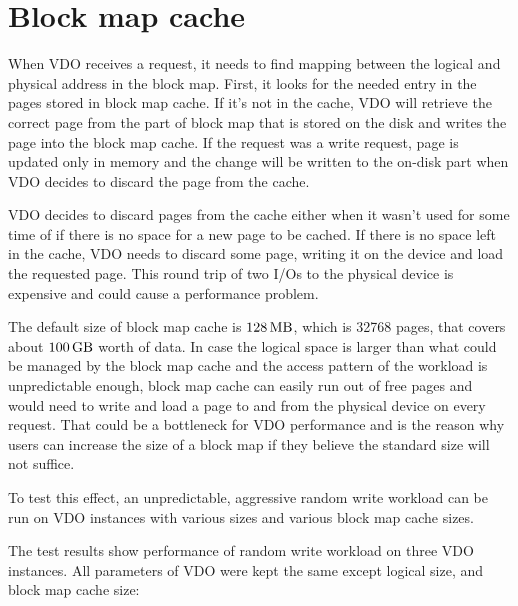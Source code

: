 \documentclass[
  color, %
  table, %
  lof,   %
  lot,   %
]{fithesis3}
\begin{document}
\section{Block map cache}

When VDO receives a request, it needs to find mapping between the logical and physical address in the block map. First, it looks for the needed entry in the pages stored in block map cache. If it's not in the cache, VDO will retrieve the correct page from the part of block map that is stored on the disk and writes the page into the block map cache. If the request was a write request, page is updated only in memory and the change will be written to the on-disk part when VDO decides to discard the page from the cache.

VDO decides to discard pages from the cache either when it wasn't used for some time of if there is no space for a new page to be cached. If there is no space left in the cache, VDO needs to discard some page, writing it on the device and load the requested page. This round trip of two I/Os to the physical device is expensive and could cause a performance problem.

The default size of block map cache is $\SI{128}{\mega\byte}$, which is 32768 pages, that covers about $\SI{100}{\giga\byte}$ worth of data. In case the logical space is larger than what could be managed by the block map cache and the access pattern of the workload is unpredictable enough, block map cache can easily run out of free pages and would need to write and load a page to and from the physical device on every request. That could be a bottleneck for VDO performance and is the reason why users can increase the size of a block map if they believe the standard size will not suffice.

To test this effect, an unpredictable, aggressive random write workload can be run on VDO instances with various sizes and various block map cache sizes.

The test results show performance of random write workload on three VDO instances. All parameters of VDO were kept the same except logical size, and block map cache size:
\end{document}
